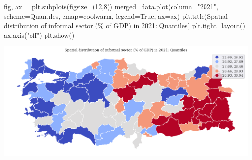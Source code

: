 \documentclass[
  letterpaper,
  DIV=11,
  numbers=noendperiod]{scrreprt}
\newenvironment{Shaded}{\begin{snugshade}}{\end{snugshade}}
\newcommand{\DecValTok}[1]{\textcolor[rgb]{0.68,0.00,0.00}{#1}}
\newcommand{\NormalTok}[1]{\textcolor[rgb]{0.00,0.23,0.31}{#1}}
\newcommand{\OperatorTok}[1]{\textcolor[rgb]{0.37,0.37,0.37}{#1}}
\newcommand{\SpecialCharTok}[1]{\textcolor[rgb]{0.37,0.37,0.37}{#1}}
\newcommand{\StringTok}[1]{\textcolor[rgb]{0.13,0.47,0.30}{#1}}
\newcommand{\VariableTok}[1]{\textcolor[rgb]{0.07,0.07,0.07}{#1}}
\begin{document}
\begin{Shaded}
\begin{Highlighting}[]
\NormalTok{fig, ax }\OperatorTok{=}\NormalTok{ plt.subplots(figsize}\OperatorTok{=}\NormalTok{(}\DecValTok{12}\NormalTok{,}\DecValTok{8}\NormalTok{))}
\NormalTok{merged\_data.plot(column}\OperatorTok{=}\StringTok{"2021"}\NormalTok{, scheme}\OperatorTok{=}\StringTok{\textquotesingle{}Quantiles\textquotesingle{}}\NormalTok{,  cmap}\OperatorTok{=}\StringTok{\textquotesingle{}coolwarm\textquotesingle{}}\NormalTok{, legend}\OperatorTok{=}\VariableTok{True}\NormalTok{, ax}\OperatorTok{=}\NormalTok{ax)}
\NormalTok{plt.title(}\StringTok{\textquotesingle{}Spatial distribution of informal sector (}\SpecialCharTok{\% o}\StringTok{f GDP) in 2021: Quantiles\textquotesingle{}}\NormalTok{)}
\NormalTok{plt.tight\_layout()}
\NormalTok{ax.axis(}\StringTok{"off"}\NormalTok{)}
\NormalTok{plt.show()}
\end{Highlighting}
\end{Shaded}

\includegraphics{labs/final_informal_files/figure-pdf/cell-7-output-1.png}
\end{document}
